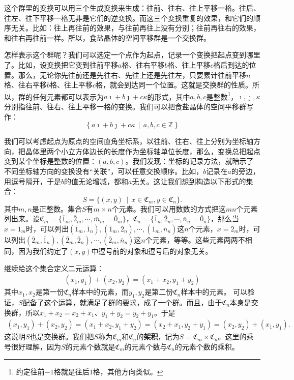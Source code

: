\documentclass[12pt,UTF8,fontset=none]{ctexbook}
\begin{document}
这个群里的变换可以用三个生成变换来生成：往前、往右、往上平移一格。往后、往左、往下平移一格无非是它们的逆变换。而这三个变换重复的效果，和它们的顺序无关。比如：往上再往前的效果，与往前再往上没有分别；往前再往右的效果，和往右再往前一样。所以，食盐晶体的空间平移群是一个交换群。

怎样表示这个群呢？我们可以选定一个点作为起点，记录一个变换把起点变到哪里了。比如，设变换把它变到往前平移$a$格、往右平移$b$格、往上平移$c$格后到达的位置。那么，无论你先往前还是先往右、先往上还是先往左，只要累计往前平移$n$格、往右平移$b$格、往上平移$c$格，就会到达同一个位置。这就是交换群的性质。所以，群的任何元素都可以表示为$a\imath + b\jmath + c\kappa$的形式，其中$a,b,c$是整数\footnote{约定往前$-1$格就是往后$1$格，其他方向类似。}，$\imath, \jmath, \kappa$分别指往前、往右、往上平移一格的变换。我们可以把食盐晶体的空间平移群写作：
$$ \left\{a\imath + b\jmath + c\kappa\,\mid\,a,b,c\in\mathbb{Z}\right\} $$

我们可以考虑起点为原点的空间直角坐标系，以往前、往右、往上分别为坐标轴方向，把晶体里两个小立方体边长的长度作为坐标轴单位长度，那么，变换总把起点变到某个坐标是整数的位置：$(a,b,c)$。我们发现：坐标的记录方法，就暗示了不同坐标轴方向的变换没有“关联”，可以任意交换顺序。比如，$b$记录在$a$的旁边，用逗号隔开，于是$b$的值无论增减，都和$a$无关。这让我们想到构造以下形式的集合：
$$ S = \{(x,y) \,\mid\, x\in \mathfrak{C}_m,y\in \mathfrak{C}_n\}. $$
其中$m,n$是正整数。集合$S$有$m\times n$个元素。我们可以用数数的方式把这$mn$个元素列出来。设$\mathfrak{C}_m = \{\overline{1}_m, \overline{2}_m,\cdots, \overline{m}_m = \overline{0}_m\}$，$\mathfrak{C}_n =\{\overline{1}_n, \overline{2}_n,\cdots, \overline{n}_n = \overline{0}_n\}$，那么当$x=\overline{1}_m$时，可以列出$(\overline{1}_m,\overline{1}_n),(\overline{1}_m,\overline{2}_n),\cdots,(\overline{1}_m,\overline{n}_n)$这$n$个元素，$x=\overline{2}_m$时，可以列出$(\overline{2}_m,\overline{1}_n),(\overline{2}_m,\overline{2}_n),\cdots,(\overline{2}_m,\overline{n}_n)$这$n$个元素，等等。这些元素两两不相同，因为我们约定了$(x,y)$中逗号前的对象和逗号后的对象无关。

继续给这个集合定义二元运算：
\begin{align*}
    (x_1, y_1) + (x_2, y_2) = (x_1+x_2, y_1+y_2)
\end{align*}
其中$x_1,x_2$是第一份$\mathfrak{C}_n$样本中的元素，而$y_1,y_2$是第二份$\mathfrak{C}_n$样本中的元素。
可以验证，$S$配备了这个运算，就满足了群的要求，成了一个群。而且，由于$\mathfrak{C}_n$本身是交换群，所以$x_1+x_2=x_2+x_1$、$y_1+y_2=y_2+y_1$。于是
\begin{align*}
    (x_1, y_1) + (x_2, y_2) = (x_1+x_2, y_1+y_2) = (x_2+x_1,y_2+y_1) = (x_2, y_2) + (x_1, y_1).
\end{align*}
这说明$S$也是交换群。我们把$S$称为$\mathfrak{C}_m$和$\mathfrak{C}_n$的\textbf{架积}，记为$S = \mathfrak{C}_m\times \mathfrak{C}_n$。这里的乘号很好理解，因为$S$的元素个数就是$\mathfrak{C}_m$的元素个数与$\mathfrak{C}_n$的元素个数的乘积。
\end{document}
